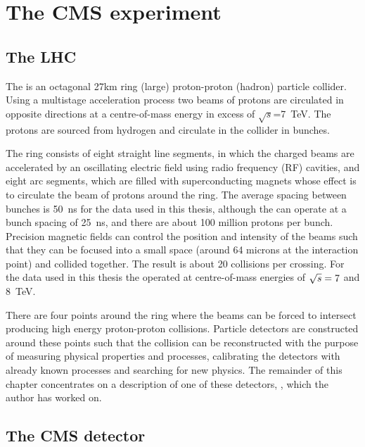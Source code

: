 \chapter{The CMS experiment}
\label{chap:cms}

\section{The LHC}

The \LHC is an octagonal 27km ring (large) proton-proton (hadron) particle collider. Using a multistage acceleration process two beams of protons are circulated in opposite directions at a centre-of-mass energy in excess of $\sqrt{s}$=7~TeV. The protons are sourced from hydrogen and circulate in the collider in bunches.  


The \LHC ring consists of eight straight line segments, in which the charged beams are accelerated by an oscillating electric field using radio frequency (RF) cavities, and eight arc segments, which are filled with superconducting magnets whose effect is to circulate the beam of protons around the ring. The average spacing between bunches is 50~ns for the data used in this thesis, although the \LHC can operate at a bunch spacing of 25~ns, and there are about 100 million protons per bunch. Precision magnetic fields can control the position and intensity of the beams such that they can be focused into a small space (around 64 microns at the interaction point) and collided together. The result is about 20 collisions per crossing. For the data used in this thesis the \LHC operated at centre-of-mass energies of $\sqrt{s}=7$ and 8~TeV. 

There are four points around the ring where the beams can be forced to intersect producing high energy proton-proton collisions. Particle detectors are constructed around these points such that the collision can be reconstructed with the purpose of measuring physical properties and processes, calibrating the detectors with already known processes and searching for new physics. The remainder of this chapter concentrates on a description of one of these detectors, \CMS, which the author has worked on.

\section{The CMS detector}

